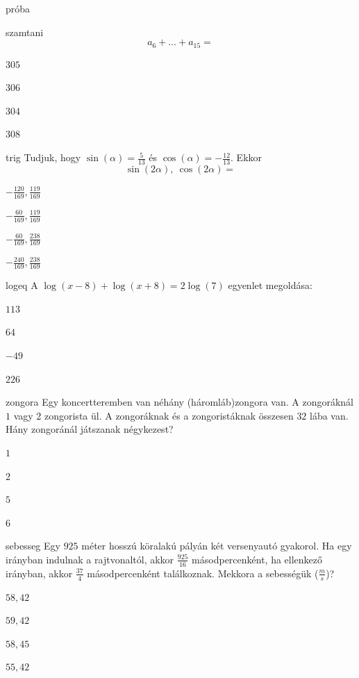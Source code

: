 \documentclass[12pt]{article}
\begin{document}
\begin{quiz}{próba}
\begin{multi}{szamtani}
$$
a_{6}+\ldots +a_{15}=
$$
\item* $305$
\item  $306$
\item  $304$
\item  $308$
\end{multi}
\begin{multi}{trig}
Tudjuk, hogy $ \sin(\alpha) =\frac{5}{13}$ és $ \cos(\alpha) = -\frac{12}{13} $. 
Ekkor $$ \sin(2\alpha),\ \cos(2\alpha)=$$
\item* $ -\frac{120}{169}, \frac{119}{169} $
\item  $ -\frac{60}{169}, \frac{119}{169} $
\item  $ -\frac{60}{169}, \frac{238}{169} $
\item  $ -\frac{240}{169}, \frac{238}{169} $
\end{multi}
\begin{multi}{logeq}
A $ \log(x-8)+\log(x+8)=2\log(7) $ egyenlet megoldása:
\item* $ 113  $
\item  $ 64 $
\item  $ -49 $
\item  $ 226 $
\end{multi}
\begin{multi}{zongora}
Egy koncertteremben van néhány (háromláb)zongora van. A zongoráknál 
$1$ vagy $2$ zongorista ül. A zongoráknak és a zongoristáknak összesen $32$ 
lába van. Hány zongoránál játszanak négykezest?
\item* $ 1  $
\item  $ 2 $
\item  $ 5 $
\item  $ 6 $
\end{multi}
\begin{multi}{sebesseg}
Egy $925$ méter hosszú köralakú pályán két versenyautó gyakorol. Ha egy irányban 
indulnak a rajtvonaltól, akkor $\frac{925}{16}$ másodpercenként, ha ellenkező irányban, akkor 
$\frac{37}{4}$ másodpercenként találkoznak. Mekkora a sebességük ($\frac{m}{s}$)?
\item* $ 58, 42  $
\item  $ 59, 42 $
\item  $ 58, 45 $
\item  $ 55, 42 $
\end{multi}
\end{quiz}
\end{document}

